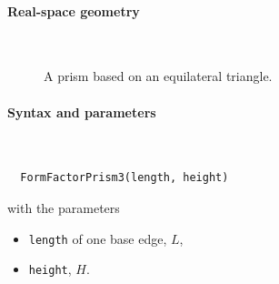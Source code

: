  \label{SPrism3}

\paragraph{Real-space geometry}\strut\\


\begin{figure}[H]
\hfill
{}
\hfill
{}
\hfill
{}
\hfill
\caption{A prism based on an equilateral triangle.}
\end{figure}

\FloatBarrier

\paragraph{Syntax and parameters}\strut\\[-2ex plus .2ex minus .2ex]
\begin{lstlisting}
  FormFactorPrism3(length, height)
\end{lstlisting}
with the parameters
\begin{itemize}
\item \texttt{length} of one base edge, $L$,
\item \texttt{height}, $H$.
\end{itemize}

